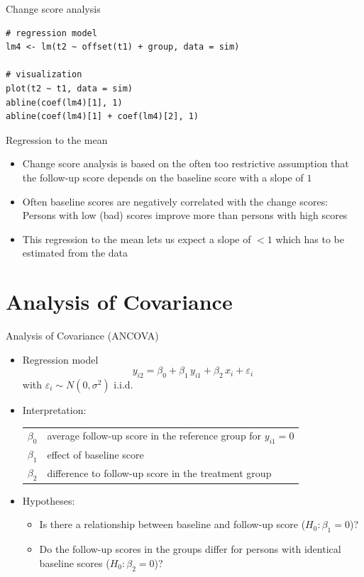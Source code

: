\documentclass[aspectratio=169]{beamer}
\begin{document}
\begin{frame}[fragile]{Change score analysis}
\begin{lstlisting}
# regression model
lm4 <- lm(t2 ~ offset(t1) + group, data = sim)

# visualization
plot(t2 ~ t1, data = sim)
abline(coef(lm4)[1], 1)
abline(coef(lm4)[1] + coef(lm4)[2], 1)
\end{lstlisting}
\end{frame}

\begin{frame}{Regression to the mean}
\begin{itemize}
  \item Change score analysis is based on the often too restrictive
    assumption that the follow-up score depends on the baseline score with
    a slope of $1$
  \item Often baseline scores are negatively correlated with the change
    scores:\\
    Persons with low (bad) scores improve more than persons with high scores
  \item This regression to the mean lets us expect a slope of $< 1$ which
    has to be estimated from the data
\end{itemize}
\end{frame}

\section[ANCOVA]{Analysis of Covariance}

\begin{frame}{Analysis of Covariance (ANCOVA)}
\begin{itemize}
  \item Regression model
    \[
      y_{i2} = \beta_0 + \beta_1 \, y_{i1} + \beta_2 \, x_i + \varepsilon_i
    \]
    with $\varepsilon_i \sim N(0, \sigma^2)$ i.i.d.
  \item Interpretation:
    \begin{tabular}{lp{10cm}}
    $\beta_0$ & average follow-up score in the reference group for $y_{i1} = 0$\\
    $\beta_1$ & effect of baseline score\\
    $\beta_2$ & difference to follow-up score in the treatment group
    \end{tabular}
  \item Hypotheses:
    \begin{itemize}
        \item Is there a relationship between baseline and follow-up score ($H_0\colon \beta_1 = 0$)?
        \item Do the follow-up scores in the groups differ for persons with
          identical baseline scores ($H_0\colon \beta_2 = 0$)?
    \end{itemize}
\end{itemize}
\end{frame}
\end{document}
